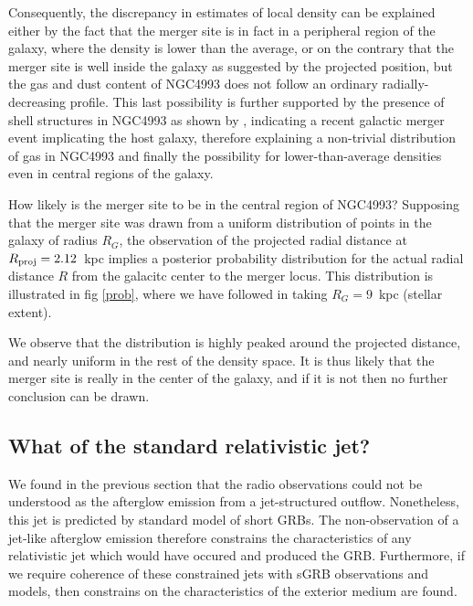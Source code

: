 Consequently, the discrepancy in estimates of local density can be explained either by the fact that the merger site is in fact in a peripheral region of the galaxy, where the density is lower than the average, or on the contrary that the merger site is well inside the galaxy as suggested by the projected position, but the gas and dust content of NGC4993 does not follow an ordinary radially-decreasing profile. This last possibility is further supported by the presence of shell structures in NGC4993 as shown by \cite{33}, indicating a recent galactic merger event implicating the host galaxy, therefore explaining a non-trivial distribution of gas in NGC4993 and finally the possibility for lower-than-average densities even in central regions of the galaxy.

How likely is the merger site to be in the central region of NGC4993? Supposing that the merger site was drawn from a uniform distribution of points in the galaxy of radius $R_G$, the observation of the projected radial distance at $R_\rm{proj} = 2.12$~kpc implies a posterior probability distribution for the actual radial distance $R$ from the galacitc center to the merger locus. This distribution is illustrated in fig \ref{prob}, where we have followed \cite{12} in taking $R_G = 9$~kpc (stellar extent).


We observe that the distribution is highly peaked around the projected distance, and nearly uniform in the rest of the density space. It is thus likely that the merger site is really in the center of the galaxy, and if it is not then no further conclusion can be drawn.






\subsection{What of the standard relativistic jet?}

We found in the previous section that the radio observations could not be understood as the afterglow emission from a jet-structured outflow. Nonetheless, this jet is predicted by standard model of short GRBs. The non-observation of a jet-like afterglow emission therefore constrains the characteristics of any relativistic jet which would have occured and produced the GRB. Furthermore, if we require coherence of these constrained jets with sGRB observations and models, then constrains on the characteristics of the exterior medium are found. 

